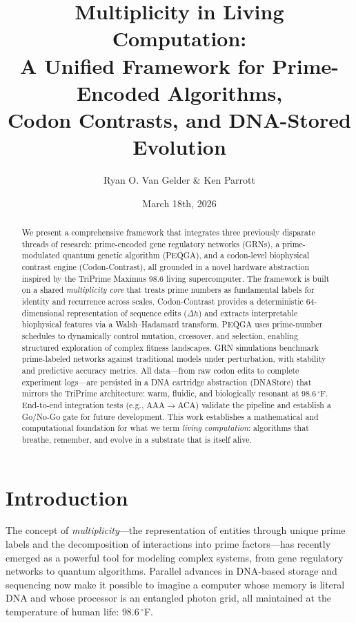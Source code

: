 \documentclass[12pt]{article}
\title{Multiplicity in Living Computation: \\ A Unified Framework for Prime-Encoded Algorithms, \\ Codon Contrasts, and DNA-Stored Evolution}
\author{Ryan O. Van Gelder \& Ken Parrott}
\date{March 18th, 2026}
\begin{document}
\maketitle

\begin{abstract}
We present a comprehensive framework that integrates three previously disparate threads of research: prime-encoded gene regulatory networks (GRNs), a prime-modulated quantum genetic algorithm (PEQGA), and a codon-level biophysical contrast engine (Codon-Contrast), all grounded in a novel hardware abstraction inspired by the TriPrime Maximus 98.6 living supercomputer. The framework is built on a shared \emph{multiplicity core} that treats prime numbers as fundamental labels for identity and recurrence across scales. Codon-Contrast provides a deterministic 64-dimensional representation of sequence edits ($\Delta h$) and extracts interpretable biophysical features via a Walsh–Hadamard transform. PEQGA uses prime-number schedules to dynamically control mutation, crossover, and selection, enabling structured exploration of complex fitness landscapes. GRN simulations benchmark prime-labeled networks against traditional models under perturbation, with stability and predictive accuracy metrics. All data—from raw codon edits to complete experiment logs—are persisted in a DNA cartridge abstraction (DNAStore) that mirrors the TriPrime architecture: warm, fluidic, and biologically resonant at $98.6\,^\circ$F. End-to-end integration tests (e.g., AAA$\to$ACA) validate the pipeline and establish a Go/No-Go gate for future development. This work establishes a mathematical and computational foundation for what we term \emph{living computation}: algorithms that breathe, remember, and evolve in a substrate that is itself alive.
\end{abstract}

\section{Introduction}

The concept of \emph{multiplicity}—the representation of entities through unique prime labels and the decomposition of interactions into prime factors—has recently emerged as a powerful tool for modeling complex systems, from gene regulatory networks to quantum algorithms. Parallel advances in DNA-based storage and sequencing now make it possible to imagine a computer whose memory is literal DNA and whose processor is an entangled photon grid, all maintained at the temperature of human life: $98.6\,^\circ$F.
\end{document}
